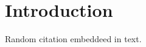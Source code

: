 \chapter*{Introduction}

\lipsum[1-3]
Random citation \cite{DUMMY:1} embeddeed in text.
\lipsum[4-6]